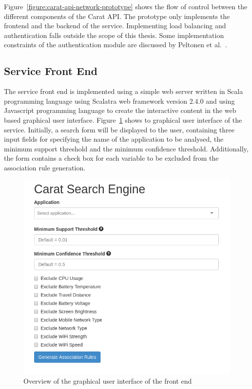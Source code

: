 Figure~\ref{figure:carat-api-network-prototype} shows the flow of control between the different components of the Carat API. The prototype only implements the frontend and the backend of the service. Implementing load balancing and authentication falls outside the scope of this thesis. Some implementation constraints of the authentication module are discussed by Peltonen et al.~\cite{7840871}.     

\subsection{Service Front End} 

The service front end is implemented using a simple web server written in Scala programming language using Scalatra web framework version 2.4.0 and using Javascript programming language to create the interactive content in the web based graphical user interface. Figure~\ref{figure:frontend-overview} shows to graphical user interface of the service. Initially, a search form will be displayed to the user, containing three input fields for specifying the name of the application to be analysed, the minimum support threshold and the minimum confidence threshold. Additionally, the form contains a check box for each variable to be excluded from the association rule generation. 

\begin{figure} %
	\centering
	\includegraphics[width=\textwidth]{images/frontend/frontend_overview.png}
	\caption{Overview of the graphical user interface of the front end}
	\label{figure:frontend-overview}
\end{figure} 

